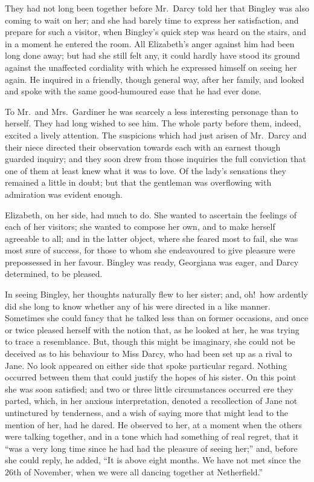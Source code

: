\documentclass[12pt,english,oneside]{book}
\begin{document}
They had not long been together before Mr.\ Darcy told her that Bingley
was also coming to wait on her; and she had barely time to express
her satisfaction, and prepare for such a visitor, when Bingley's quick
step was heard on the stairs, and in a moment he entered the room.
All Elizabeth's anger against him had been long done away; but had
she still felt any, it could hardly have stood its ground against
the unaffected cordiality with which he expressed himself on seeing
her again. He inquired in a friendly, though general way, after her
family, and looked and spoke with the same good-humoured ease that
he had ever done.

To Mr.\ and Mrs.\ Gardiner he was scarcely a less interesting personage
than to herself. They had long wished to see him. The whole party
before them, indeed, excited a lively attention. The suspicions which
had just arisen of Mr.\ Darcy and their niece directed their observation
towards each with an earnest though guarded inquiry; and they soon
drew from those inquiries the full conviction that one of them at
least knew what it was to love. Of the lady's sensations they remained
a little in doubt; but that the gentleman was overflowing with admiration
was evident enough.

Elizabeth, on her side, had much to do. She wanted to ascertain the
feelings of each of her visitors; she wanted to compose her own, and
to make herself agreeable to all; and in the latter object, where
she feared most to fail, she was most sure of success, for those to
whom she endeavoured to give pleasure were prepossessed in her favour.
Bingley was ready, Georgiana was eager, and Darcy determined, to be
pleased.

In seeing Bingley, her thoughts naturally flew to her sister; and,
oh!\ how ardently did she long to know whether any of his were directed
in a like manner. Sometimes she could fancy that he talked less than
on former occasions, and once or twice pleased herself with the notion
that, as he looked at her, he was trying to trace a resemblance. But,
though this might be imaginary, she could not be deceived as to his
behaviour to Miss Darcy, who had been set up as a rival to Jane. No
look appeared on either side that spoke particular regard. Nothing
occurred between them that could justify the hopes of his sister.
On this point she was soon satisfied; and two or three little circumstances
occurred ere they parted, which, in her anxious interpretation, denoted
a recollection of Jane not untinctured by tenderness, and a wish of
saying more that might lead to the mention of her, had he dared. He
observed to her, at a moment when the others were talking together,
and in a tone which had something of real regret, that it {}``was
a very long time since he had had the pleasure of seeing her;'' and,
before she could reply, he added, {}``It is above eight months. We
have not met since the 26th of November, when we were all dancing
together at Netherfield.''
\end{document}
